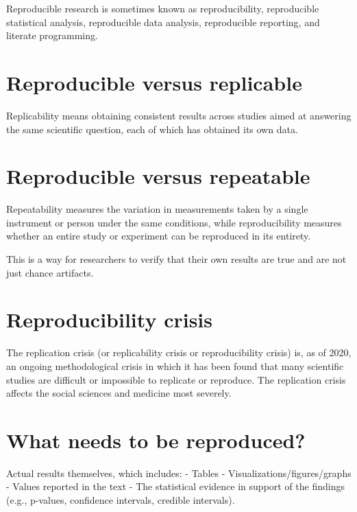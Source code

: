 \documentclass[]{book}
\begin{document}
Reproducible research is sometimes known as reproducibility, reproducible statistical analysis, reproducible data analysis, reproducible reporting, and literate programming.

\hypertarget{reproducible-versus-replicable}{%
\section{Reproducible versus replicable}\label{reproducible-versus-replicable}}

Replicability means obtaining consistent results across studies aimed at answering the same scientific question, each of which has obtained its own data.

\hypertarget{reproducible-versus-repeatable}{%
\section{Reproducible versus repeatable}\label{reproducible-versus-repeatable}}

Repeatability measures the variation in measurements taken by a single instrument or person under the same conditions, while reproducibility measures whether an entire study or experiment can be reproduced in its entirety.

This is a way for researchers to verify that their own results are true and are not just chance artifacts.

\hypertarget{reproducibility-crisis}{%
\section{Reproducibility crisis}\label{reproducibility-crisis}}

The replication crisis (or replicability crisis or reproducibility crisis) is, as of 2020, an ongoing methodological crisis in which it has been found that many scientific studies are difficult or impossible to replicate or reproduce. The replication crisis affects the social sciences and medicine most severely.

\hypertarget{what-needs-to-be-reproduced}{%
\section{What needs to be reproduced?}\label{what-needs-to-be-reproduced}}

Actual results themselves, which includes:
- Tables
- Visualizations/figures/graphs
- Values reported in the text
- The statistical evidence in support of the findings (e.g., p-values, confidence intervals, credible intervals).
\end{document}
